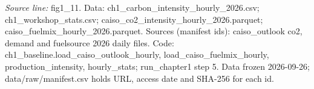 {\scriptsize\textit{Source line:} fig1\_\allowbreak{}11. Data: ch1\_\allowbreak{}carbon\_\allowbreak{}intensity\_\allowbreak{}hourly\_\allowbreak{}2026.csv; ch1\_\allowbreak{}workshop\_\allowbreak{}stats.csv; caiso\_\allowbreak{}co2\_\allowbreak{}intensity\_\allowbreak{}hourly\_\allowbreak{}2026.parquet; caiso\_\allowbreak{}fuelmix\_\allowbreak{}hourly\_\allowbreak{}2026.parquet. Sources (manifest ids): caiso\_\allowbreak{}outlook co2, demand and fuelsource 2026 daily files. Code: ch1\_\allowbreak{}baseline.load\_\allowbreak{}caiso\_\allowbreak{}outlook\_\allowbreak{}hourly, load\_\allowbreak{}caiso\_\allowbreak{}fuelmix\_\allowbreak{}hourly, production\_\allowbreak{}intensity, hourly\_\allowbreak{}stats; run\_\allowbreak{}chapter1 step 5. Data frozen 2026-09-26; data/raw/manifest.csv holds URL, access date and SHA-256 for each id.}